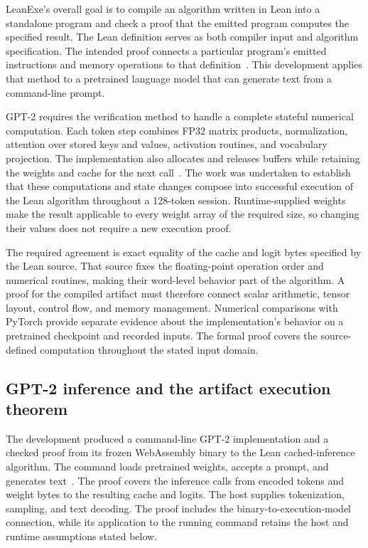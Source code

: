 \documentclass[11pt]{article}
\begin{document}
LeanExe's overall goal is to compile an algorithm written in Lean into a standalone program and check a proof that the emitted program computes the specified result.  The Lean definition serves as both compiler input and algorithm specification.  The intended proof connects a particular program's emitted instructions and memory operations to that definition~\cite{subset}.  This development applies that method to a pretrained language model that can generate text from a command-line prompt.

GPT-2 requires the verification method to handle a complete stateful numerical computation.  Each token step combines FP32 matrix products, normalization, attention over stored keys and values, activation routines, and vocabulary projection.  The implementation also allocates and releases buffers while retaining the weights and cache for the next call~\cite{cached,entry}.  The work was undertaken to establish that these computations and state changes compose into successful execution of the Lean algorithm throughout a 128-token session.  Runtime-supplied weights make the result applicable to every weight array of the required size, so changing their values does not require a new execution proof.

The required agreement is exact equality of the cache and logit bytes specified by the Lean source.  That source fixes the floating-point operation order and numerical routines, making their word-level behavior part of the algorithm.  A proof for the compiled artifact must therefore connect scalar arithmetic, tensor layout, control flow, and memory management.  Numerical comparisons with PyTorch provide separate evidence about the implementation's behavior on a pretrained checkpoint and recorded inputs.  The formal proof covers the source-defined computation throughout the stated input domain.

\subsection{GPT-2 inference and the artifact execution theorem}

The development produced a command-line GPT-2 implementation and a checked proof from its frozen WebAssembly binary to the Lean cached-inference algorithm.  The command loads pretrained weights, accepts a prompt, and generates text~\cite{guide}.  The proof covers the inference calls from encoded tokens and weight bytes to the resulting cache and logits.  The host supplies tokenization, sampling, and text decoding.  The proof includes the binary-to-execution-model connection, while its application to the running command retains the host and runtime assumptions stated below.
\end{document}
